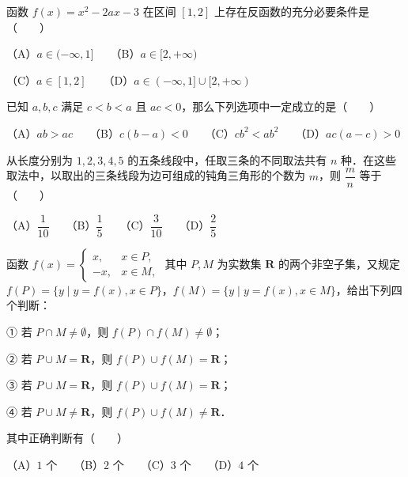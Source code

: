 \begin{question}
函数 $f(x)=x^2-2ax-3$ 在区间 $[1, 2]$ 上存在反函数的充分必要条件是\mbox{（　　）}

（A）$a\in(-\infty, 1]$　　（B）$a\in[2, +\infty)$

（C）$a\in[1, 2]$　　（D）$a\in(-\infty, 1]\cup[2, +\infty)$

\end{question}
\begin{question}
已知 $a, b, c$ 满足 $c<b<a$ 且 $ac<0$，那么下列选项中一定成立的是\mbox{（　　）}

（A）$ab>ac$　　（B）$c(b-a)<0$　　（C）$cb^2<ab^2$　　（D）$ac(a-c)>0$

\end{question}
\begin{question}
从长度分别为 $1, 2, 3, 4, 5$ 的五条线段中，任取三条的不同取法共有 $n$ 种．在这些取法中，以取出的三条线段为边可组成的钝角三角形的个数为 $m$，则 $\dfrac{m}{n}$ 等于\mbox{（　　）}

（A）$\dfrac{1}{10}$　　（B）$\dfrac{1}{5}$　　（C）$\dfrac{3}{10}$　　（D）$\dfrac{2}{5}$

\end{question}
\begin{question}
函数 $f(x)=\begin{cases} x, & x\in P, \\ -x, & x\in M, \end{cases}$ 其中 $P, M$ 为实数集 $\mathbf{R}$ 的两个非空子集，又规定 $f(P)=\{y\mid y=f(x), x\in P\}$，$f(M)=\{y\mid y=f(x), x\in M\}$，给出下列四个判断：

① 若 $P\cap M\neq\emptyset$，则 $f(P)\cap f(M)\neq\emptyset$；

② 若 $P\cup M=\mathbf{R}$，则 $f(P)\cup f(M)=\mathbf{R}$；

③ 若 $P\cup M=\mathbf{R}$，则 $f(P)\cup f(M)=\mathbf{R}$；

④ 若 $P\cup M\neq\mathbf{R}$，则 $f(P)\cup f(M)\neq\mathbf{R}$．

其中正确判断有\mbox{（　　）}

（A）$1$ 个　　（B）$2$ 个　　（C）$3$ 个　　（D）$4$ 个

\end{question}

